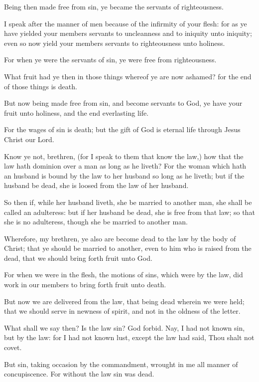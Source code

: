 \Verse Being then made free from sin, ye became the servants of righteousness.

\Verse I speak after the manner of men because of the infirmity of your flesh: for as ye have yielded your members servants to uncleanness and to iniquity unto iniquity; even so now yield your members servants to righteousness unto holiness.

\Verse For when ye were the servants of sin, ye were free from righteousness.

\Verse What fruit had ye then in those things whereof ye are now ashamed?  for the end of those things is death.

\Verse But now being made free from sin, and become servants to God, ye have your fruit unto holiness, and the end everlasting life.

\Verse For the wages of sin is death; but the gift of God is eternal life through Jesus Christ our Lord.


\Chapter
\Verse Know ye not, brethren, (for I speak to them that know the law,) how that the law hath dominion over a man as long as he liveth?  \Verse For the woman which hath an husband is bound by the law to her husband so long as he liveth; but if the husband be dead, she is loosed from the law of her husband.

\Verse So then if, while her husband liveth, she be married to another man, she shall be called an adulteress: but if her husband be dead, she is free from that law; so that she is no adulteress, though she be married to another man.

\Verse Wherefore, my brethren, ye also are become dead to the law by the body of Christ; that ye should be married to another, even to him who is raised from the dead, that we should bring forth fruit unto God.

\Verse For when we were in the flesh, the motions of sins, which were by the law, did work in our members to bring forth fruit unto death.

\Verse But now we are delivered from the law, that being dead wherein we were held; that we should serve in newness of spirit, and not in the oldness of the letter.

\Verse What shall we say then? Is the law sin? God forbid. Nay, I had not known sin, but by the law: for I had not known lust, except the law had said, Thou shalt not covet.

\Verse But sin, taking occasion by the commandment, wrought in me all manner of concupiscence. For without the law sin was dead.

